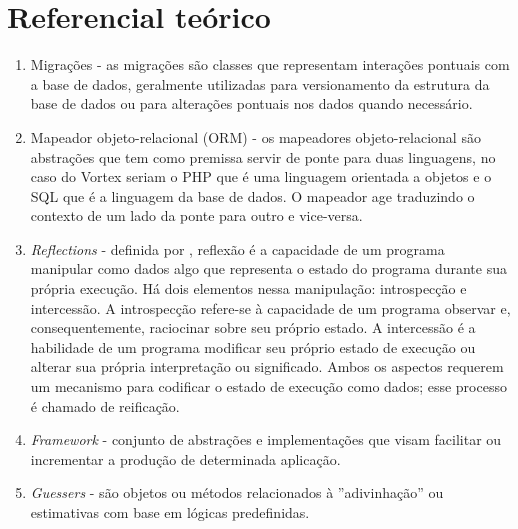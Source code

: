 \section{Referencial teórico}
\begin{enumerate}
    \item\label{rt_migrations} Migrações - as migrações são classes que representam interações pontuais com a base de dados, geralmente utilizadas para versionamento da estrutura da base de dados ou para alterações pontuais nos dados quando necessário.
    \item\label{rt_orm} Mapeador objeto-relacional (ORM) - os mapeadores objeto-relacional são abstrações que tem como premissa servir de ponte para duas linguagens, no caso do Vortex seriam o PHP que é uma linguagem orientada a objetos e o SQL que é a linguagem da base de dados. O mapeador age traduzindo o contexto de um lado da ponte para outro e vice-versa.
    \item\label{rt_reflections} \textit{Reflections} -   definida por \citep{gabriel1991clos}, reflexão é a capacidade de um programa manipular como dados algo que representa o estado do programa durante sua própria execução. Há dois elementos nessa manipulação: introspecção e intercessão. A introspecção refere-se à capacidade de um programa observar e, consequentemente, raciocinar sobre seu próprio estado. A intercessão é a habilidade de um programa modificar seu próprio estado de execução ou alterar sua própria interpretação ou significado. Ambos os aspectos requerem um mecanismo para codificar o estado de execução como dados; esse processo é chamado de reificação.
    \item\label{rt_framework} \textit{Framework} - conjunto de abstrações e implementações que visam facilitar ou incrementar a produção de determinada aplicação.
    \item\label{rt_guessers} \textit{Guessers} - são objetos ou métodos relacionados à ''adivinhação'' ou estimativas com base em lógicas predefinidas.
\end{enumerate}